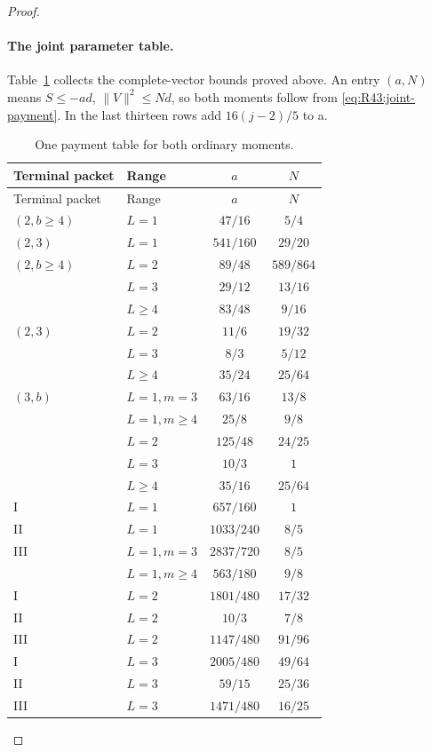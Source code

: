 \begin{proof}
\paragraph{The joint parameter table.}\label{part:R43:payments}
Table~\ref{tab:R43:joint-data} collects the complete-vector bounds
proved above. An entry \((a,N)\) means \(S\le-ad\),
\(\|V\|^2\le Nd\), so both moments follow from
\eqref{eq:R43:joint-payment}. In the last thirteen rows add
\(16(j-2)/5\) to a.
\begin{longtable}{@{}llcc@{}}
\caption{One payment table for both ordinary moments.}
\label{tab:R43:joint-data}\\
\toprule Terminal packet&Range&\(a\)&\(N\)\\\midrule
\endfirsthead
\toprule Terminal packet&Range&\(a\)&\(N\)\\\midrule
\endhead\bottomrule\endfoot
\((2,b\ge4)\)&\(L=1\)&\(47/16\)&\(5/4\)\\
\((2,3)\)&\(L=1\)&\(541/160\)&\(29/20\)\\
\((2,b\ge4)\)&\(L=2\)&\(89/48\)&\(589/864\)\\
 &\(L=3\)&\(29/12\)&\(13/16\)\\
 &\(L\ge4\)&\(83/48\)&\(9/16\)\\
\((2,3)\)&\(L=2\)&\(11/6\)&\(19/32\)\\
 &\(L=3\)&\(8/3\)&\(5/12\)\\
 &\(L\ge4\)&\(35/24\)&\(25/64\)\\
\((3,b)\)&\(L=1,m=3\)&\(63/16\)&\(13/8\)\\
 &\(L=1,m\ge4\)&\(25/8\)&\(9/8\)\\
 &\(L=2\)&\(125/48\)&\(24/25\)\\
 &\(L=3\)&\(10/3\)&\(1\)\\
 &\(L\ge4\)&\(35/16\)&\(25/64\)\\\midrule
I&\(L=1\)&\(657/160\)&\(1\)\\
II&\(L=1\)&\(1033/240\)&\(8/5\)\\
III&\(L=1,m=3\)&\(2837/720\)&\(8/5\)\\
 &\(L=1,m\ge4\)&\(563/180\)&\(9/8\)\\
I&\(L=2\)&\(1801/480\)&\(17/32\)\\
II&\(L=2\)&\(10/3\)&\(7/8\)\\
III&\(L=2\)&\(1147/480\)&\(91/96\)\\
I&\(L=3\)&\(2005/480\)&\(49/64\)\\
II&\(L=3\)&\(59/15\)&\(25/36\)\\
III&\(L=3\)&\(1471/480\)&\(16/25\)\\

\end{longtable}
\end{proof}
